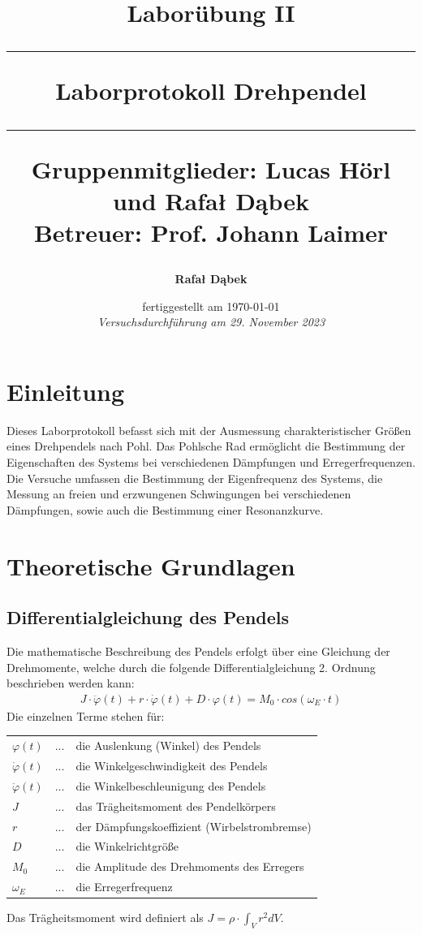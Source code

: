 \documentclass{article}
\title{
    \LARGE \textbf{Laborübung II}
    \vspace{0.5cm}
    \hrule height 2pt
    \vspace{0.5cm}
    \textbf{Laborprotokoll Drehpendel}
    \vspace{0.5cm}
    \hrule height 2pt
    \vspace*{15\baselineskip}
    {
        \small Gruppenmitglieder: Lucas Hörl und Rafał Dąbek
        \\
		Betreuer: Prof. Johann Laimer
    }

}
\author{
    \textbf{Rafał Dąbek}
}
\date{
    fertiggestellt am \today \\
    \textit{Versuchsdurchführung am 29. November 2023}
}
\begin{document}
\maketitle
\clearpage

\tableofcontents
\clearpage

\section{Einleitung}
Dieses Laborprotokoll befasst sich mit der Ausmessung charakteristischer Größen eines Drehpendels nach Pohl. Das Pohlsche Rad
ermöglicht die Bestimmung der Eigenschaften des Systems bei verschiedenen Dämpfungen und Erregerfrequenzen.
Die Versuche umfassen die Bestimmung der Eigenfrequenz des Systems, die Messung an freien und erzwungenen Schwingungen bei verschiedenen Dämpfungen,
sowie auch die Bestimmung einer Resonanzkurve.

\section{Theoretische Grundlagen}
\subsection{Differentialgleichung des Pendels}
Die mathematische Beschreibung des Pendels erfolgt über eine Gleichung der Drehmomente, welche durch die folgende
Differentialgleichung 2. Ordnung beschrieben werden kann:
\begin{gather} \label{eq:pendel}
    J \cdot \ddot \varphi(t) + r \cdot \dot \varphi(t) + D \cdot \varphi(t) = M_{0} \cdot cos(\omega_{E} \cdot t)
\end{gather}
Die einzelnen Terme stehen für:
\begin{flushleft}
\begin{tabular}{lc@{ }l}
    $\varphi(t)$ & ... & die Auslenkung (Winkel) des Pendels\\
    $\dot \varphi(t)$ & ... & die Winkelgeschwindigkeit des Pendels\\
    $\ddot \varphi(t)$ & ... & die Winkelbeschleunigung des Pendels\\
    $J$ & ... & das Trägheitsmoment des Pendelkörpers\\
    $r$ & ... & der Dämpfungskoeffizient (Wirbelstrombremse)\\
    $D$ & ... & die Winkelrichtgröße\\
    $M_{0}$ & ... & die Amplitude des Drehmoments des Erregers\\
    $\omega_{E}$ & ... & die Erregerfrequenz
\end{tabular}
\end{flushleft}
Das Trägheitsmoment wird definiert als $J = \rho \cdot \int_{V}^{} r^{2} dV$.
\cite{w:traegheit}
\end{document}
